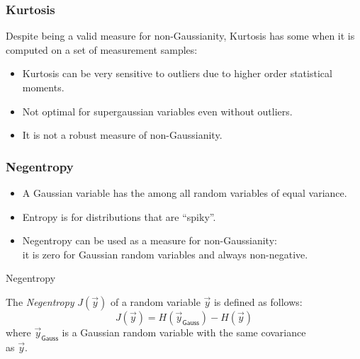\begin{frame}
  \frametitle{Kurtosis \cont}
  
  Despite being a valid measure for non-Gaussianity, Kurtosis has some  when it is computed on a set of measurement samples:

  \begin{itemize}
    \item Kurtosis can be very sensitive to outliers due to higher order statistical moments. \pause
    \item Not optimal for supergaussian variables even without outliers. \pause
    \item It is not a robust measure of non-Gaussianity.
  \end{itemize}
\end{frame}


\begin{frame}
  \frametitle{Negentropy}
  

  \begin{itemize}
    \item A Gaussian variable has the  among all random variables of equal variance. \pause
    \item Entropy is  for distributions that are ``spiky''. \pause
    \item Negentropy can be used as a measure for non-Gaussianity: \\
      it is zero for Gaussian random variables and always non-negative.
  \end{itemize}
  \pspread

  \begin{citeblock}{Negentropy}
   
 The \textit{Negentropy} $J(\vec{y})$ of a random variable $\vec{y}$ is defined as follows:
    \begin{displaymath}
      J(\vec{y}) = H(\vec{y}_{\mathsf{Gauss}}) - H(\vec{y})
    \end{displaymath}
    where $\vec{y}_{\mathsf{Gauss}}$ is a Gaussian random variable with the same covariance \\
    as $\vec{y}$.
  \end{citeblock}
\end{frame}


